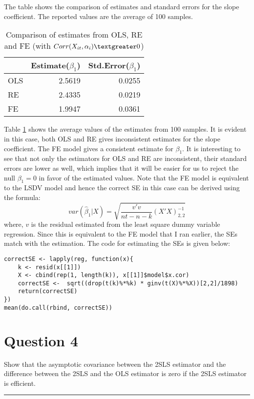 \documentclass{article}
\newcommand{\floatintro}[1]{
  
  \vspace*{0.1in}
  
  {\footnotesize

    #1
    
  }
  
  \vspace*{0.1in} } \newcommand{\myrule}{\noindent\rule{16cm}{0.5pt}}
\begin{document}
\begin{table}[ht]
  \floatintro{The table shows the comparison of estimates and standard
    errors for the slope coefficient. The reported values are the
    average of 100 samples.}
  \centering
  \begin{tabular}{lrr}
    \hline
    & Estimate($\beta_1$) & Std.Error($\beta_1$) \\ 
    \hline
    OLS & 2.5619 & 0.0255 \\ 
    RE & 2.4335 & 0.0219 \\ 
    FE & 1.9947 & 0.0361 \\ 
    \hline
  \end{tabular}
  \caption{Comparison of estimates from OLS, RE and FE (with
    $Corr(X_{it}, \alpha_i)\textgreater0$)}
  \label{tab:q3}
\end{table}
Table \ref{tab:q3} shows the average values of the estimates from 100
samples. It is evident in this case, both OLS and RE gives
inconsistent estimates for the slope coefficient. The FE model gives
a consistent estimate for $\beta_1$. It is interesting to see that not
only the estimators for OLS and RE are inconsistent, their standard errors are lower as
well, which implies that it will be easier for us to reject the null $\beta_1=0$
in favor of the estimated values.
Note that the FE model is equivalent to the LSDV model and hence the
correct SE in this case can be derived using the formula:
\begin{equation}
  \label{eq:5}
  var(\hat \beta_1|X) = \sqrt{\frac{v'v}{nt-n-k} (X'X)^{-1}_{2,2}}
\end{equation}
where, $v$ is the residual estimated from the least square dummy
variable regression. Since this is equivalent to the FE model that I
ran earlier, the SEs match with the estimation. The code for
estimating the SEs is given below:
\begin{verbatim}
correctSE <- lapply(reg, function(x){
    k <- resid(x[[1]])
    X <- cbind(rep(1, length(k)), x[[1]]$model$x.cor)
    correctSE <-  sqrt((drop(t(k)%*%k) * ginv(t(X)%*%X))[2,2]/1898)
    return(correctSE)
})
mean(do.call(rbind, correctSE))
\end{verbatim}
\section*{Question 4}
Show that the asymptotic covariance between the 2SLS estimator and the
difference between the 2SLS and the OLS estimator is zero if the 2SLS
estimator is efficient. \\\myrule\\
\end{document}
